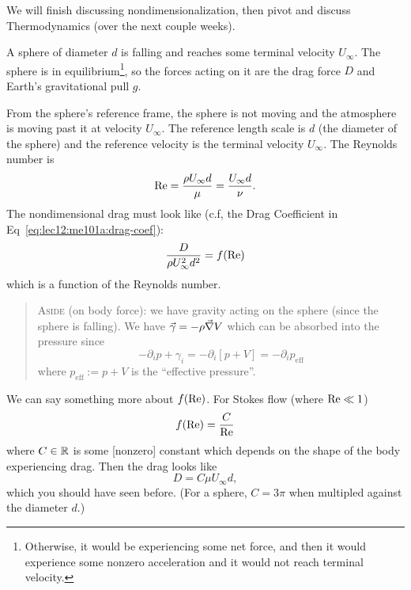 
\lecture{}

We will finish discussing nondimensionalization, then  pivot and
discuss Thermodynamics (over the next couple weeks).

\begin{example}
A sphere of diameter $d$ is falling and reaches some terminal velocity
$U_{\infty}$. The sphere is in equilibrium\footnote{Otherwise, it
would be experiencing some net force, and then it would experience
some nonzero acceleration and it would not reach terminal velocity.},
so the forces acting on it are the drag force $D$ and Earth's
gravitational pull $g$.

From the sphere's reference frame, the sphere is not
moving and the atmosphere is moving past it at velocity
$U_{\infty}$. The reference length scale is $d$ (the diameter of the
sphere) and the reference velocity is the terminal velocity
$U_{\infty}$. The Reynolds number is
\begin{equation}
\mathrm{Re} = \frac{\rho U_{\infty}d}{\mu}=\frac{U_{\infty}d}{\nu}.
\end{equation}
The nondimensional drag must look like (c.f, the Drag Coefficient in Eq~\eqref{eq:lec12:me101a:drag-coef}):
\begin{equation}
\frac{D}{\rho U_{\infty}^{2}d^{2}}=f(\mathrm{Re})
\end{equation}
which is a function of the Reynolds number.
\begin{quote}
\textsc{Aside} (on body force): we have gravity acting on the sphere
(since the sphere is falling). We have
$\vec{\gamma}=-\rho\vec{\nabla}V$ which can be absorbed into the
pressure since
\begin{equation}
-\partial_{i}p+\gamma_{i}=-\partial_{i}[p+V]=-\partial_{i}p_{\text{eff}}
\end{equation}
where $p_{\text{eff}}:=p+V$ is the ``effective pressure''.
\end{quote}
We can say something more about $f(\mathrm{Re})$. For Stokes flow (where $\mathrm{Re}\ll1$)
\begin{equation}
f(\mathrm{Re})=\frac{C}{\mathrm{Re}}
\end{equation}
where $C\in\mathbb{R}$ is some [nonzero] constant which depends on the shape
of the body experiencing drag. Then the drag looks like
\begin{equation}
D=C\mu U_{\infty}d,
\end{equation}
which you should have seen before. (For a sphere, $C=3\pi$ when
multipled against the diameter $d$.)


\end{example}
